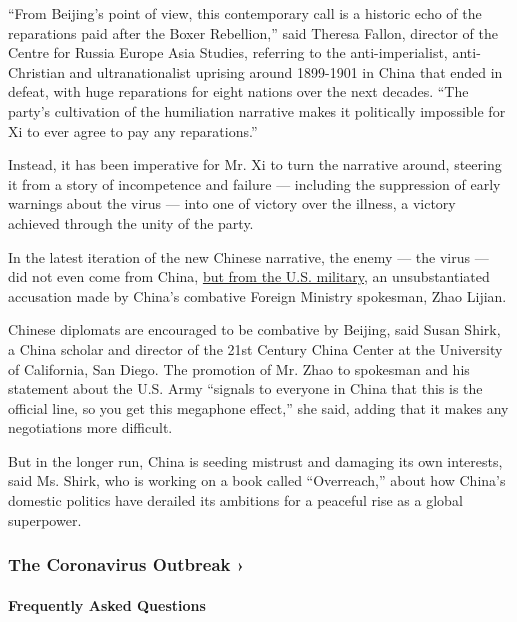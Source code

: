 ``From Beijing's point of view, this contemporary call is a historic
echo of the reparations paid after the Boxer Rebellion,'' said Theresa
Fallon, director of the Centre for Russia Europe Asia Studies, referring
to the anti-imperialist, anti-Christian and ultranationalist uprising
around 1899-1901 in China that ended in defeat, with huge reparations
for eight nations over the next decades. ``The party's cultivation of
the humiliation narrative makes it politically impossible for Xi to ever
agree to pay any reparations.''

Instead, it has been imperative for Mr. Xi to turn the narrative around,
steering it from a story of incompetence and failure --- including the
suppression of early warnings about the virus --- into one of victory
over the illness, a victory achieved through the unity of the party.

In the latest iteration of the new Chinese narrative, the enemy --- the
virus --- did not even come from China,
\href{https://www.nytimes3xbfgragh.onion/2020/03/13/world/asia/coronavirus-china-conspiracy-theory.html}{but
from the U.S. military}, an unsubstantiated accusation made by China's
combative Foreign Ministry spokesman, Zhao Lijian.

Chinese diplomats are encouraged to be combative by Beijing, said Susan
Shirk, a China scholar and director of the 21st Century China Center at
the University of California, San Diego. The promotion of Mr. Zhao to
spokesman and his statement about the U.S. Army ``signals to everyone in
China that this is the official line, so you get this megaphone
effect,'' she said, adding that it makes any negotiations more
difficult.

But in the longer run, China is seeding mistrust and damaging its own
interests, said Ms. Shirk, who is working on a book called
``Overreach,'' about how China's domestic politics have derailed its
ambitions for a peaceful rise as a global superpower.

\href{https://www.nytimes3xbfgragh.onion/news-event/coronavirus?action=click\&pgtype=Article\&state=default\&region=MAIN_CONTENT_3\&context=storylines_faq}{}

\hypertarget{the-coronavirus-outbreak-}{%
\subsubsection{The Coronavirus Outbreak
›}\label{the-coronavirus-outbreak-}}

\hypertarget{frequently-asked-questions}{%
\paragraph{Frequently Asked
Questions}\label{frequently-asked-questions}}

